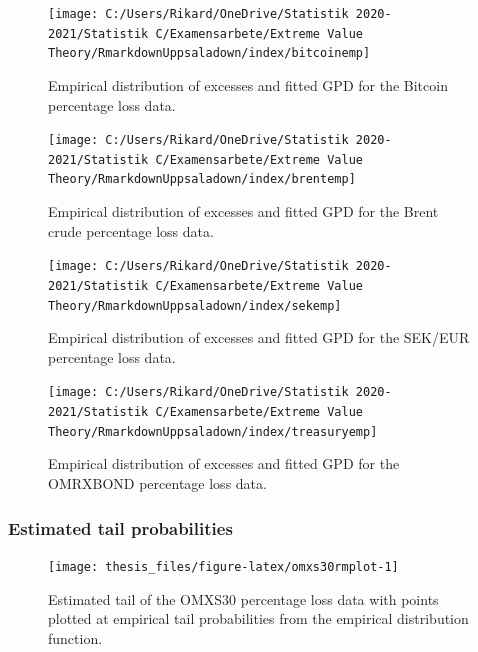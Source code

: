 \documentclass[a4paper,11pt]{article}
\theoremstyle{definition}
\theoremstyle{definition}
\theoremstyle{definition}
\theoremstyle{definition}
\theoremstyle{remark}
\begin{document}
\begin{figure}[H]

{\centering \texttt{[image: C:/Users/Rikard/OneDrive/Statistik 2020-2021/Statistik C/Examensarbete/Extreme Value Theory/RmarkdownUppsaladown/index/bitcoinemp]} 

}

\caption{Empirical distribution of excesses and fitted GPD for the Bitcoin percentage loss data.}\label{fig:empbitcoin}
\end{figure}
\begin{figure}[H]

{\centering \texttt{[image: C:/Users/Rikard/OneDrive/Statistik 2020-2021/Statistik C/Examensarbete/Extreme Value Theory/RmarkdownUppsaladown/index/brentemp]} 

}

\caption{Empirical distribution of excesses and fitted GPD for the Brent crude percentage loss data.}\label{fig:empbrent}
\end{figure}
\begin{figure}[H]

{\centering \texttt{[image: C:/Users/Rikard/OneDrive/Statistik 2020-2021/Statistik C/Examensarbete/Extreme Value Theory/RmarkdownUppsaladown/index/sekemp]} 

}

\caption{Empirical distribution of excesses and fitted GPD for the SEK/EUR percentage loss data.}\label{fig:empsek}
\end{figure}
\begin{figure}[H]

{\centering \texttt{[image: C:/Users/Rikard/OneDrive/Statistik 2020-2021/Statistik C/Examensarbete/Extreme Value Theory/RmarkdownUppsaladown/index/treasuryemp]} 

}

\caption{Empirical distribution of excesses and fitted GPD for the OMRXBOND percentage loss data.}\label{fig:emptreasury}
\end{figure}
\hypertarget{sec:tailprobabilities}{%
\subsubsection{Estimated tail probabilities}\label{sec:tailprobabilities}}
\begin{figure}[H]

{\centering \texttt{[image: thesis\_files/figure-latex/omxs30rmplot-1]} 

}

\caption{Estimated tail of the OMXS30 percentage loss data with points plotted at empirical tail probabilities from the empirical distribution function.}\label{fig:omxs30rmplot}
\end{figure}
\end{document}
